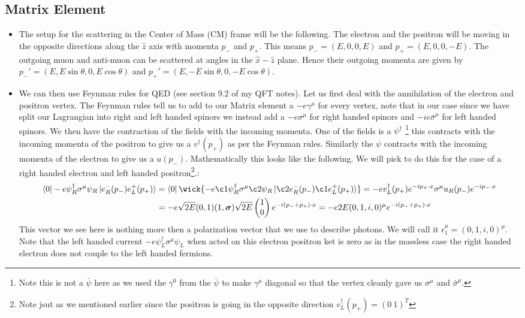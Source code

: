 \documentclass[11pt]{article}
\numberwithin{equation}{section}
\begin{document}
\subsection{Matrix Element} %
\label{sub:matrix_element}
\begin{itemize}
    \item The setup for the scattering in the Center of Mass (CM) frame will be the following. The electron and the positron will be moving in the opposite directions along the $\hat{z}$ axis with momenta $p_-$ and $p_+$. This means $p_- = (E,0,0,E)$ and $p_+ = (E,0,0,-E)$. The outgoing muon and anti-muon can be scattered at angles in the $\hat{x}-\hat{z}$ plane. Hence their outgoing momenta are given by $p_-' = (E,E\sin \theta,0,E\cos \theta)$ and $p_+' = (E,-E\sin \theta,0,-E\cos \theta)$.

    \item We can then use Feynman rules for QED (see section 9.2 of my QFT notes). Let us first deal with the annihilation of the electron and positron vertex. The Feynman rules tell us to add to our Matrix element a $-e\gamma^{\mu}$ for every vertex, note that in our case since we have split our Lagrangian into right and left handed spinors we instead add a $-e\sigma^{\mu}$ for right handed spinors and $-ie\bar{\sigma}^{\mu}$ for left handed spinors. We then have the contraction of the fields with the incoming momenta. One of the fields is a $\psi^{\dagger}$ \footnote{Note this is not a $\bar{\psi}$ here as we used the $\gamma^{0}$ from the $\bar{\psi}$ to make $\gamma^{\mu}$ diagonal so that the vertex cleanly gave us $\sigma^{\mu}$ and $\bar{\sigma}^{\mu}$.} this contracts with the incoming momenta of the positron to give us a $v^{\dagger}(p_+)$ as per the Feynman rules. Similarly the $\psi$ contracts with the incoming momenta of the electron to give us a $u(p_-)$. Mathematically this looks like the following. We will pick to do this for the case of a right handed electron and left handed positron\footnote{Note jsut as we mentioned earlier since the positron is going in the opposite direction $v_L^{\dagger}(p_+) = (0~1)^{T}$}.:
    \begin{align*}
        \bra{0}- e\psi^{\dagger}_R\sigma^{\mu}\psi_R\ket{e_R^{-}(p_-)e_L^{+}(p_+)} &=  \bra{0}\wick{- e\c1 \psi^{\dagger}_R\sigma^{\mu}\c2 \psi_R\ket{\c2e_R^{-}(p_-) \c1e_L^{+}(p_+)}} = -ev_L^{\dagger}(p_+)e^{-ip_+\cdot x}\sigma^{\mu}u_R(p_-)e^{-ip_-\cdot x} \\
         & = -e\sqrt{2E}(0 , 1)(1,\boldsymbol{\sigma})\sqrt{2E}\begin{pmatrix}
             1 \\0 
         \end{pmatrix}e^{-i(p_-+p_+)\cdot x} = -e2E(0,1,i,0)^{\mu}e^{-i(p_-+p_+)\cdot x}
    \end{align*}
    This vector we see here is nothing more then a polarization vector that we use to describe photons. We will call it $\epsilon^{\mu}_1 = (0,1,i,0)^{\mu}$. Note that the left handed current $- e\psi^{\dagger}_L\sigma^{\mu}\psi_L$ when acted on this electron positron ket is zero as in the massless case the right handed electron does not couple to the left handed fermions. 


\end{itemize}
\end{document}
